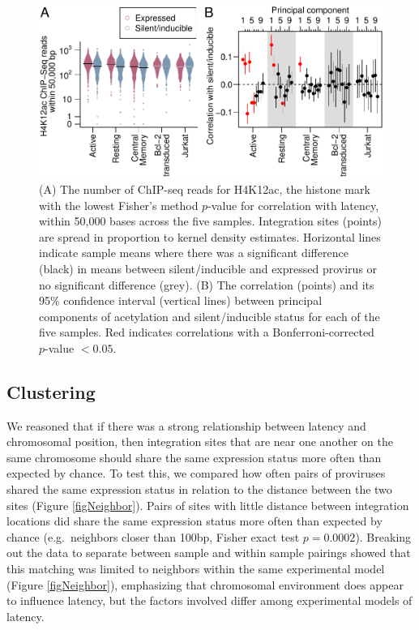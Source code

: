 \documentclass[../sherrill-Mix_thesis.tex]{subfiles}
\begin{document}
	\begin{figure}
		\centering
			\includegraphics[width=\textwidth]{acetylation.pdf} %
		\caption[Acetylation and latency]{(A) The number of ChIP-seq reads for H4K12ac, the histone mark with the lowest Fisher's method $p$-value for correlation with latency, within 50,000 bases across the five samples. Integration sites (points) are spread in proportion to kernel density estimates. Horizontal lines indicate sample means where there was a significant difference (black) in means between silent/inducible and expressed provirus or no significant difference (grey). (B) The correlation (points) and its 95\% confidence interval (vertical lines) between principal components of acetylation and silent/inducible status for each of the five samples. Red indicates correlations with a Bonferroni-corrected $p$-value $< 0.05$.}
		\label{figAcetylation}
	\end{figure}



	\subsection{Clustering}
	 We reasoned that if there was a strong relationship between latency and chromosomal position, then integration sites that are near one another on the same chromosome should share the same expression status more often than expected by chance. To test this, we compared how often pairs of proviruses shared the same expression status in relation to the distance between the two sites (Figure \ref{figNeighbor}). Pairs of sites with little distance between integration locations did share the same expression status more often than expected by chance (e.g.\  neighbors closer than 100bp, Fisher exact test $p=0.0002$). Breaking out the data to separate between sample and within sample pairings showed that this matching was limited to neighbors within the same experimental model (Figure \ref{figNeighbor}), emphasizing that chromosomal environment does appear to influence latency, but the factors involved differ among experimental models of latency. 
\end{document}
